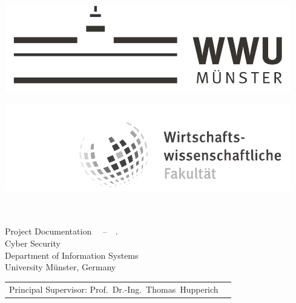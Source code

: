 
\begin{titlepage}
\makeatletter

\enlargethispage{3cm}

\begin{minipage}{0.45\textwidth}
	\includegraphics[width=\textwidth]{data/assets/wwu-logo}
\end{minipage}
\hspace{.1\textwidth}
\begin{minipage}{0.45\textwidth}
	\includegraphics[width=\textwidth]{data/assets/faculty-de}
\end{minipage}


\vspace*{10cm}
\begin{minipage}[b]{1\linewidth}
	\sffamily
  	\hspace{-17.2mm}

   	\textbf{\LARGE {\@title}}\\

  	\Large{\@author}\\

	\vspace{4cm}
  	\normalsize{
    Project Documentation \@~~--~~\@date\@.\\
   	Cyber Security\\Department of Information Systems\\
   	University Münster, Germany\\}
	\newline
	\normalsize{
	\begin{tabular}{@{}ll@{}}
	Principal Supervisor: Prof.~Dr.-Ing.~Thomas~Hupperich\\
	\end{tabular}
	}
\end{minipage}


\makeatother
\end{titlepage}

